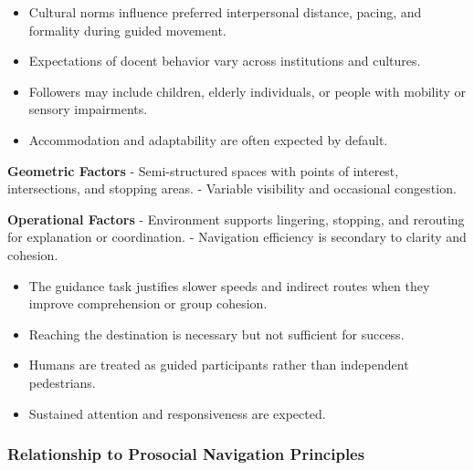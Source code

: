 \documentclass[utf8]{frontiers_suppmat} %
\providecommand{\tightlist}{%
  \setlength{\itemsep}{0pt}\setlength{\parskip}{0pt}}
\begin{document}
\begin{itemize}
\tightlist
\item
  Cultural norms influence preferred interpersonal distance, pacing, and
  formality during guided movement.
\item
  Expectations of docent behavior vary across institutions and cultures.
\end{itemize}

\label{diversity-context}

\begin{itemize}
\tightlist
\item
  Followers may include children, elderly individuals, or people with
  mobility or sensory impairments.
\item
  Accommodation and adaptability are often expected by default.
\end{itemize}

\label{environmental-context}

\textbf{Geometric Factors} - Semi-structured spaces with points of
interest, intersections, and stopping areas. - Variable visibility and
occasional congestion.

\textbf{Operational Factors} - Environment supports lingering, stopping,
and rerouting for explanation or coordination. - Navigation efficiency
is secondary to clarity and cohesion.

\label{task-context}

\begin{itemize}
\tightlist
\item
  The guidance task justifies slower speeds and indirect routes when
  they improve comprehension or group cohesion.
\item
  Reaching the destination is necessary but not sufficient for success.
\end{itemize}

\label{interpersonal-context}

\begin{itemize}
\tightlist
\item
  Humans are treated as guided participants rather than independent
  pedestrians.
\item
  Sustained attention and responsiveness are expected.
\end{itemize}

\subsubsection{Relationship to Prosocial Navigation
Principles}\label{relationship-to-prosocial-navigation-principles}
\end{document}
